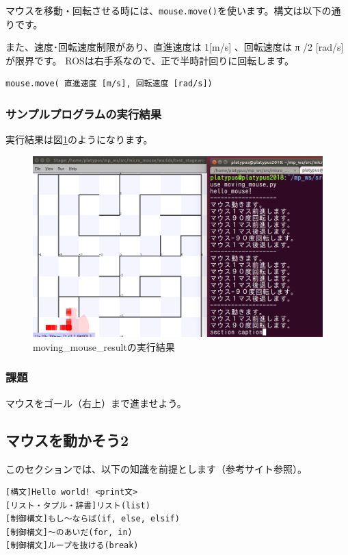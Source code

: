 \documentclass[11pt,a4paper]{jsarticle}
\begin{document}
マウスを移動・回転させる時には、\verb|mouse.move()|を使います。構文は以下の通りです。

また、速度･回転速度制限があり、直進速度は 1[m/s] 、回転速度は π /2 [rad/s] が限界です。
ROSは右手系なので、正で半時計回りに回転します。

\begin{lstlisting}[frame=single]
mouse.move( 直進速度 [m/s], 回転速度 [rad/s])
\end{lstlisting}



\subsubsection{サンプルプログラムの実行結果}
実行結果は図\ref{moving_mouse_result}のようになります。
\begin{figure}[h]
  \begin{center}
    \includegraphics[width=128mm]{./moving_mouse_result.png}
  \end{center}
  \label{moving_mouse_result}
  \caption{moving\_mouse\_resultの実行結果}
\end{figure}

\subsubsection{課題}
マウスをゴール（右上）まで進ませよう。


\newpage
\subsection{マウスを動かそう2}
このセクションでは、以下の知識を前提とします（参考サイト参照）。
\begin{lstlisting}[frame=single]
[構文]Hello world! <print文>
[リスト・タプル・辞書]リスト(list)
[制御構文]もし～ならば(if, else, elsif)
[制御構文]～のあいだ(for, in)
[制御構文]ループを抜ける(break)
\end{lstlisting}
\end{document}

